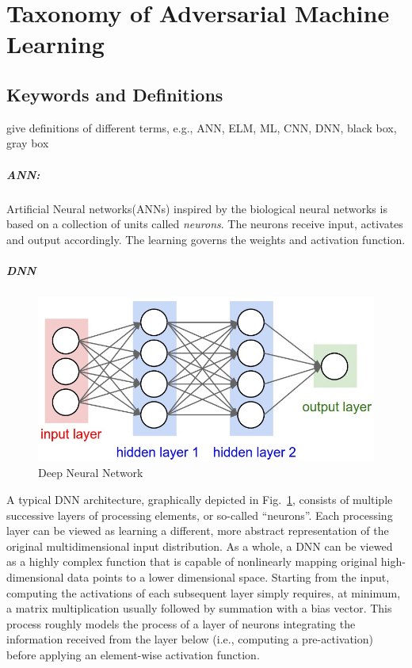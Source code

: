 \documentclass{article}
\newcommand{\ach}[1]{{\color{red}#1}}
\begin{document}
\section{Taxonomy of Adversarial Machine Learning}\label{taxonomy}

\subsection{Keywords and Definitions}
\ach{give definitions of different terms, e.g., ANN, ELM, ML, CNN, DNN, black box, gray box}
\subparagraph{ANN:}Artificial Neural networks(ANNs) inspired by the biological neural networks is based on a collection of units called \emph{neurons}. The neurons receive input, activates and output accordingly. The learning governs the weights and activation function. 

\subparagraph{DNN}
\begin{figure}[h!]
	\centering
	\includegraphics[width=0.9\columnwidth]{dnn}
	\caption{Deep Neural Network}
	\label{fig:dnn}
\end{figure}

A typical DNN architecture, graphically depicted in Fig.~\ref{fig:dnn}, consists of multiple successive layers of processing elements, or so-called “neurons”. Each processing layer can be viewed as learning a different, more abstract representation of the original multidimensional input distribution. As a whole, a DNN can be viewed as a highly complex function that is capable of nonlinearly mapping original high-dimensional data points to a lower dimensional space. Starting from the input, computing the activations of each subsequent layer simply requires, at minimum, a matrix multiplication usually followed by summation with a bias vector. This process roughly models the process of a layer of neurons integrating the information received from the layer below (i.e., computing a pre-activation) before applying an element-wise activation function.
\end{document}
